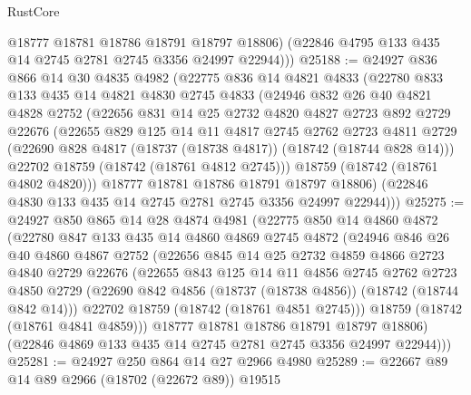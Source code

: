 \begin{lexlean}{RustCore}
\begin{coremodule}
          @18777
          @18781
          @18786
          @18791
          @18797
          @18806)
        (@22846 @4795 @133 @435 @14 @2745 @2781 @2745 @3356 @24997 @22944)))
@25188 := @24927
    @836
    @866
    @14
    @30
    @4835
    @4982
    (@22775
      @836
      @14
      @4821
      @4833
      (@22780
        @833
        @133
        @435
        @14
        @4821
        @4830
        @2745
        @4833
        (@24946
          @832
          @26
          @40
          @4821
          @4828
          @2752
          (@22656
            @831
            @14
            @25
            @2732
            @4820
            @4827
            @2723
            @892
            @2729
            @22676
            (@22655
              @829
              @125
              @14
              @11
              @4817
              @2745
              @2762
              @2723
              @4811
              @2729
              (@22690 @828 @4817 (@18737 (@18738 @4817)) (@18742 (@18744 @828 @14)))
              @22702
              @18759
              (@18742 (@18761 @4812 @2745)))
            @18759
            (@18742 (@18761 @4802 @4820)))
          @18777
          @18781
          @18786
          @18791
          @18797
          @18806)
        (@22846 @4830 @133 @435 @14 @2745 @2781 @2745 @3356 @24997 @22944)))
@25275 := @24927
    @850
    @865
    @14
    @28
    @4874
    @4981
    (@22775
      @850
      @14
      @4860
      @4872
      (@22780
        @847
        @133
        @435
        @14
        @4860
        @4869
        @2745
        @4872
        (@24946
          @846
          @26
          @40
          @4860
          @4867
          @2752
          (@22656
            @845
            @14
            @25
            @2732
            @4859
            @4866
            @2723
            @4840
            @2729
            @22676
            (@22655
              @843
              @125
              @14
              @11
              @4856
              @2745
              @2762
              @2723
              @4850
              @2729
              (@22690 @842 @4856 (@18737 (@18738 @4856)) (@18742 (@18744 @842 @14)))
              @22702
              @18759
              (@18742 (@18761 @4851 @2745)))
            @18759
            (@18742 (@18761 @4841 @4859)))
          @18777
          @18781
          @18786
          @18791
          @18797
          @18806)
        (@22846 @4869 @133 @435 @14 @2745 @2781 @2745 @3356 @24997 @22944)))
@25281 := @24927 @250 @864 @14 @27 @2966 @4980
@25289 := @22667 @89 @14 @89 @2966 (@18702 (@22672 @89)) @19515

\end{coremodule}
\end{lexlean}
